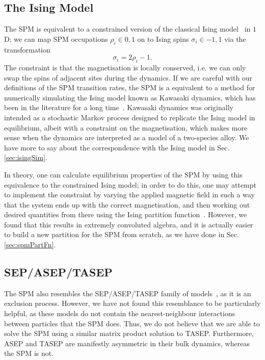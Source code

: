 \subsection{The Ising Model}
The SPM is equivalent to a constrained version of the classical Ising 
model~\cite{lenz1920, Ising1925, strecka2015} in $1$D; we can map SPM
occupations $\rho_i \in {0, 1}$ on to Ising spins $\sigma_i \in {-1, 1}$ via the transformation
\begin{equation}
 \sigma_i = 2 \rho_i - 1 .
\end{equation}
The constraint is that the magnetisation is locally conserved, i.e. we can only swap the spins of adjacent
sites during the dynamics. If we are careful with our definitions of the SPM transition rates,
the SPM is a equivalent to a method for numerically simulating the Ising model known as Kawasaki
dynamics, which has been in the literature for a long time~\cite{kawasaki1966, Garrido1990, grynberg2010}. 
Kawasaki dynamics was originally intended as
a stochastic Markov process designed to replicate the Ising model in equilibrium, albeit with a
constraint on the magnetisation, which makes more sense when the
dynamics are interpreted as a model of a two-species alloy. We have more 
to say about the correspondence with the Ising model in Sec. \ref{sec:isingSim}.

In theory, one can calculate equilibrium properties of the SPM by using this equivalence to the constrained
Ising model; in order to do this, one may attempt to implement the constraint by varying the applied
magnetic field in such a way that the system ends up with the correct magnetisation, and then working
out desired quantities from there using the Ising partition function~\cite{baxter2016}. However, we found that
this results
in extremely convoluted algebra, and it is actually easier to build a new partition for the SPM from 
scratch, as we have done in Sec. \ref{sec:spmPartFn}.
\subsection{SEP/ASEP/TASEP} \label{sec:asep}
The SPM also resembles the SEP/ASEP/TASEP family of models~\cite{liggett1985, golinelli2006, blythe2007,
Crampe2014}, 
as it is an
exclusion process. However, we 
have not found this resemblance to be particularly helpful, as these models do not contain the
nearest-neighbour interactions between particles that the SPM does. Thus, we do not believe that we are
able to solve the SPM using a similar matrix product solution to TASEP. Furthermore, ASEP and TASEP
are manifestly asymmetric in their bulk dynamics, whereas the SPM is not.

